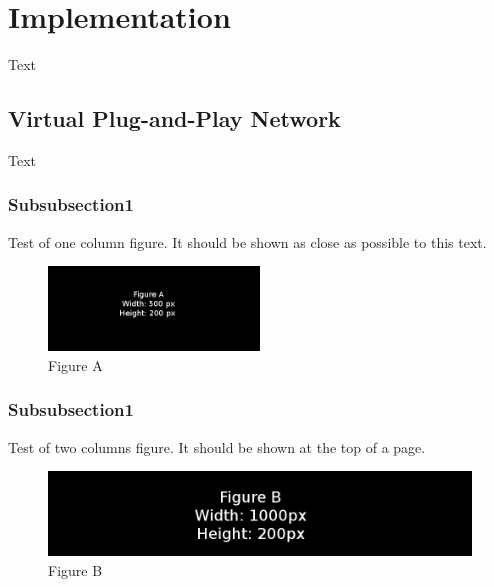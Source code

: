 \section{Implementation}\label{sec:implementation}
Text

\subsection{Virtual Plug-and-Play Network}
Text
\subsubsection{Subsubsection1}
Test of one column figure. It should be shown as close as possible to this
text.
\begin{figure}[h]
    \includegraphics[width=0.5\textwidth]{./figure/figureA.png}
    \caption{Figure A}
\end{figure}

\subsubsection{Subsubsection1}
Test of two columns figure. It should be shown at the top of a page.
\begin{figure}[t]
    \includegraphics[width=1.0\textwidth]{./figure/figureB.png}
    \caption{Figure B}
\end{figure}
